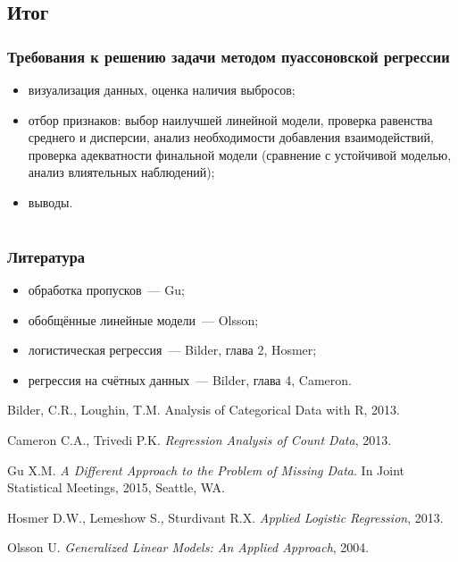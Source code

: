 \documentclass[9pt,pdf,utf8,hyperref={unicode},aspectratio=169]{beamer}
\begin{document}
\subsection{Итог}
\begin{frame}
	\frametitle{Требования к решению задачи методом пуассоновской регрессии}
	\begin{itemize}
		\item визуализация данных, оценка наличия выбросов;
		\item отбор признаков: выбор наилучшей линейной модели, проверка равенства среднего и дисперсии, анализ необходимости добавления взаимодействий, проверка адекватности финальной модели (сравнение с устойчивой моделью, анализ влиятельных наблюдений);
		\item выводы.
	\end{itemize}
\end{frame}

\section{}
\begin{frame}
\frametitle{Литература}    
    \begin{itemize}
    \item обработка пропусков~--- Gu;
    \item обобщённые линейные модели~--- Olsson;
    \item логистическая регрессия~--- Bilder, глава 2, Hosmer;
    \item регрессия на счётных данных~--- Bilder, глава 4, Cameron.
    \end{itemize}
    
    \bigskip
    
    Bilder, C.R., Loughin, T.M. Analysis of Categorical Data with R, 2013.
    		
    		\vspace{5pt}    
    		        		
	Cameron C.A., Trivedi P.K. \textit{Regression Analysis of Count Data}, 2013.   
    		
    		\vspace{5pt}    
    		        		
    Gu X.M. \textit{A Different Approach to the Problem of Missing Data}. In Joint Statistical Meetings, 2015, Seattle, WA. 
        		
        	\vspace{5pt}    			
    		
    Hosmer D.W., Lemeshow S., Sturdivant R.X. \textit{Applied Logistic Regression}, 2013. 
    		
    		\vspace{5pt}    		
    		
	Olsson U. {\em Generalized Linear Models: An Applied Approach}, 2004.
\end{frame}
\end{document}
